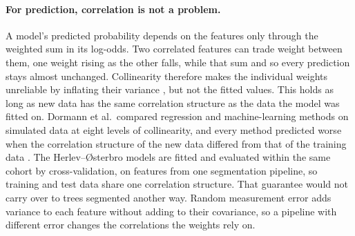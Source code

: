 \paragraph{For prediction, correlation is not a problem.}
A model's predicted probability depends on the features only through the weighted sum in its log-odds.
Two correlated features can trade weight between them, one weight rising as the other falls, while that sum and so every prediction stays almost unchanged.
Collinearity therefore makes the individual weights unreliable by inflating their variance \cite{dormann2013collinearity}, but not the fitted values.
This holds as long as new data has the same correlation structure as the data the model was fitted on.
Dormann et al.\ compared regression and machine-learning methods on simulated data at eight levels of collinearity, and every method predicted worse when the correlation structure of the new data differed from that of the training data \cite{dormann2013collinearity}.
The Herlev--{\O}sterbro models are fitted and evaluated within the same cohort by cross-validation, on features from one segmentation pipeline, so training and test data share one correlation structure.
That guarantee would not carry over to trees segmented another way.
Random measurement error adds variance to each feature without adding to their covariance, so a pipeline with different error changes the correlations the weights rely on.

